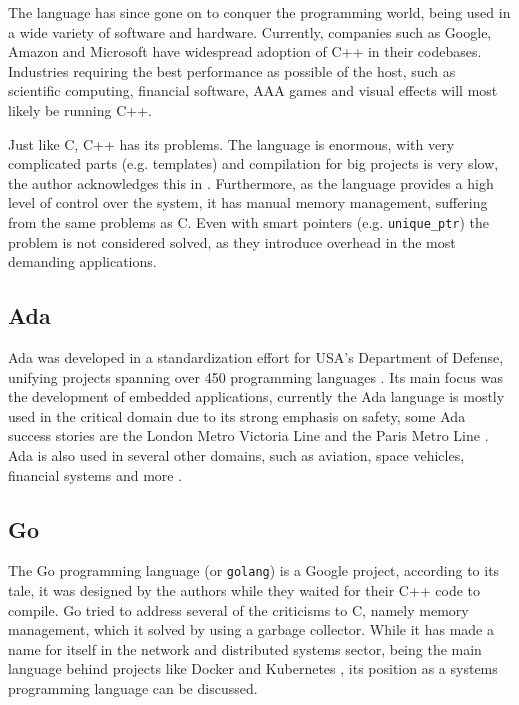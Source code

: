 The language has since gone on to conquer the programming world, being used in a wide variety of software and hardware.
Currently, companies such as Google, Amazon and Microsoft have widespread adoption of C++ in their codebases.
Industries requiring the best performance as possible of the host, such as scientific computing,
financial software, AAA games and visual effects will most likely be running C++.

Just like C, C++ has its problems.
The language is enormous, with very complicated parts (e.g. templates) and compilation for big projects is very slow,
the author acknowledges this in \autocite{Torre2014}.
Furthermore, as the language provides a high level of control over the system, it has manual memory management,
suffering from the same problems as C.
Even with smart pointers (e.g. \texttt{unique\_ptr}) the problem is not considered solved,
as they introduce overhead in the most demanding applications.


\subsection{Ada}

Ada was developed in a standardization effort for USA's Department of Defense,
unifying projects spanning over 450 programming languages \autocite{Ada2021}.
Its main focus was the development of embedded applications,
currently the Ada language is mostly used in the critical domain due to its strong emphasis on safety,
some Ada success stories are the London Metro Victoria Line and the Paris Metro Line \autocite{SIGAda2021}.
Ada is also used in several other domains, such as aviation, space vehicles, financial systems and more \autocite{Feldman2014}.

\subsection{Go}

The Go programming language (or \texttt{golang}) is a Google project,
according to its tale, it was designed by the authors while they waited for their C++ code to compile.
Go tried to address several of the criticisms to C, namely memory management,
which it solved by using a garbage collector.
While it has made a name for itself in the network and distributed systems sector,
being the main language behind projects like Docker \autocite{Docker2021} and Kubernetes \autocite{Kubernetes2021},
its position as a systems programming language can be discussed.

